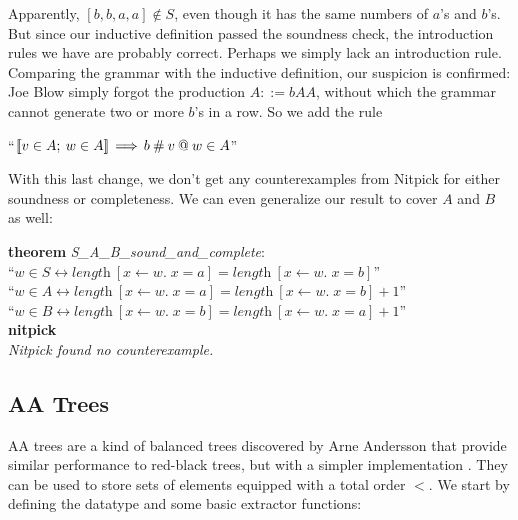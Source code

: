 \documentclass[a4paper,12pt]{article}
\begin{document}
Apparently, $[b, b, a, a] \notin S$, even though it has the same numbers of
$a$'s and $b$'s. But since our inductive definition passed the soundness check,
the introduction rules we have are probably correct. Perhaps we simply lack an
introduction rule. Comparing the grammar with the inductive definition, our
suspicion is confirmed: Joe Blow simply forgot the production $A ::= bAA$,
without which the grammar cannot generate two or more $b$'s in a row. So we add
the rule

\prew
``$\mathopen{[\![} v \in A;\> w \in A\mathclose{]\!]} \,\Longrightarrow\, b \mathbin{\#} v \mathbin{@} w \in A$''
\postw

With this last change, we don't get any counterexamples from Nitpick for either
soundness or completeness. We can even generalize our result to cover $A$ and
$B$ as well:

\prew
\textbf{theorem} \textit{S\_A\_B\_sound\_and\_complete}: \\
``$w \in S \longleftrightarrow \textit{length}~[x \mathbin{\leftarrow} w.\; x = a] = \textit{length}~[x \mathbin{\leftarrow} w.\; x = b]$'' \\
``$w \in A \longleftrightarrow \textit{length}~[x \mathbin{\leftarrow} w.\; x = a] = \textit{length}~[x \mathbin{\leftarrow} w.\; x = b] + 1$'' \\
``$w \in B \longleftrightarrow \textit{length}~[x \mathbin{\leftarrow} w.\; x = b] = \textit{length}~[x \mathbin{\leftarrow} w.\; x = a] + 1$'' \\
\textbf{nitpick} \\[2\smallskipamount]
\slshape Nitpick found no counterexample.
\postw

\subsection{AA Trees}
\label{aa-trees}

AA trees are a kind of balanced trees discovered by Arne Andersson that provide
similar performance to red-black trees, but with a simpler implementation
\cite{andersson-1993}. They can be used to store sets of elements equipped with
a total order $<$. We start by defining the datatype and some basic extractor
functions:
\end{document}
